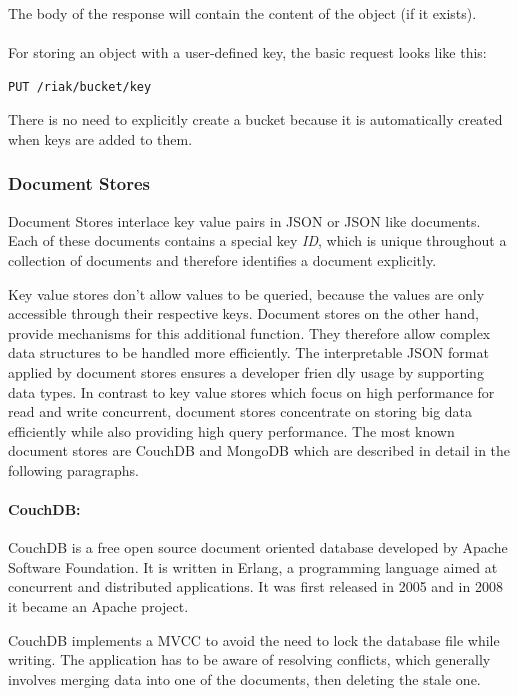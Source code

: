 The body of the response will contain the content of the object (if it exists).
\\
\\
For storing an object with a user-defined key, the basic request looks like this:

\begin{code}
\begin{verbatim}
PUT /riak/bucket/key
\end{verbatim}
\label{lst:riak_get}
\end{code}

There is no need to explicitly create a bucket because it is automatically created when keys are added to them.


\subsubsection{Document Stores}
Document Stores interlace key value pairs in \ac{JSON} or \ac{JSON} like documents. Each of these documents contains a special key \textit{ID}, which is unique throughout a collection of documents and therefore identifies a document explicitly. 

Key value stores don't allow values to be queried, because the values are only accessible through their respective keys. Document stores on the other hand, provide mechanisms for this additional function. They therefore allow complex data structures to be handled more efficiently. The interpretable \ac{JSON} format applied by document stores ensures a developer frien	dly usage by supporting data types. In contrast to key value stores which focus on high performance for read and write concurrent, document stores concentrate on storing big data efficiently while also providing high query performance. The most known document stores are CouchDB and MongoDB  which are described in detail in the following paragraphs.

\paragraph{CouchDB:} CouchDB is a free open source document oriented database developed by Apache Software Foundation. It is written in Erlang, a programming language aimed at concurrent and distributed applications. It was first released in 2005 and in 2008 it became an Apache project.

CouchDB implements a \ac{MVCC} to avoid the need to lock the database file while writing. The application has to be aware of resolving conflicts, which generally involves merging data into one of the documents, then deleting the stale one.


